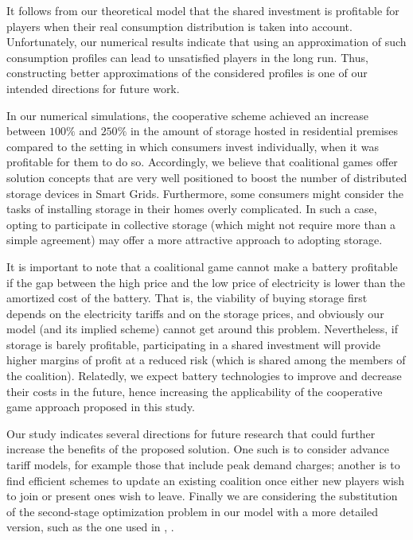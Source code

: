 It follows from our theoretical model that the shared investment is profitable for players when their real consumption distribution is taken into account. Unfortunately, our numerical results indicate that using an approximation of such consumption profiles can lead to unsatisfied players in the long run. Thus, constructing better approximations of the considered profiles is one of our intended directions for future work.

In our numerical simulations, the cooperative scheme achieved an increase between $100\%$ and $250\%$ in the amount of storage hosted in residential premises compared to the setting in which consumers invest individually, when it was profitable for them to do so. Accordingly, we believe that coalitional games offer solution concepts that are very well positioned to boost the number of distributed storage devices in Smart Grids. Furthermore, some consumers might consider the tasks of installing storage in their homes overly complicated. In such a case, opting to participate in collective storage (which might not require more than a simple agreement) may offer a more attractive approach to adopting storage.

It is important to note that a coalitional game cannot make a battery profitable if the gap between the high price and the low price of electricity is lower than the amortized cost of the battery. That is, the viability of buying storage first depends on the electricity tariffs and on the storage prices, and obviously our model (and its implied scheme) cannot get around this problem. Nevertheless, if storage is barely profitable, participating in a shared investment will provide higher margins of profit at a reduced risk (which is shared among the members of the coalition).
Relatedly, we expect battery technologies to improve and decrease their costs in the future, hence increasing the applicability of the cooperative game approach proposed in this study.

Our study indicates several directions for future research that could further increase the benefits of the proposed solution.  One such is to consider advance tariff models, for example those that include peak demand charges; another is to find efficient schemes to update an existing coalition once either new players wish to join or present ones wish to leave. Finally we are considering the substitution of the second-stage optimization problem in our model with a more detailed version, such as the one used in \cite{hashmi2019}, \cite{kiedanskiforecast}.
